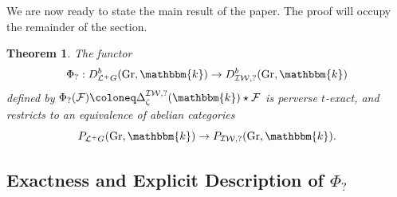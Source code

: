 \documentclass{amsart}
\renewcommand{\L}{\mathcal{L}}
\renewcommand{\k}{\mathbbm{k}}
\newcommand{\scrF}{\mathcal{F}}
\newcommand{\IW}{\mathcal{IW}}
\DeclareMathOperator{\Gr}{Gr}
\newtheorem{theorem}[subsubsection]{Theorem}
\theoremstyle{definition}
\begin{document}
    We are now ready to state the main result of the paper. The proof will occupy the remainder of the section. 

    \begin{theorem}\label{thm:cs}
        The functor 
        \[ \Phi_? : D_{\L^+ G}^b (\Gr, \k) \to D_{\IW, ?}^b (\Gr, \k)\] 
        defined by $\Phi_? (\scrF) \coloneq \Delta_{\zeta}^{\IW, ?} (\k) \star \scrF$ is perverse $t$-exact, and restricts to an equivalence of abelian categories
        \[P_{\L^+ G} (\Gr, \k) \to P_{\IW, ?} (\Gr, \k).\]
    \end{theorem}

     \subsection{Exactness and Explicit Description of \texorpdfstring{$\Phi_?$}{Phi}}
\end{document}
